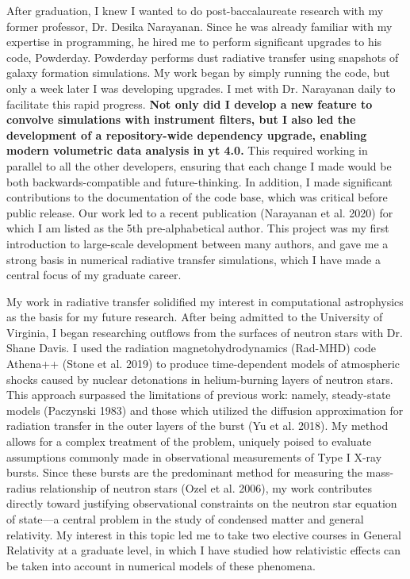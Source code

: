 \documentclass[11pt]{article}
\begin{document}
After graduation, I knew I wanted to do post-baccalaureate research with my former professor, Dr. Desika Narayanan. Since he was already familiar with my expertise in programming, he hired me to perform significant upgrades to his code, Powderday. Powderday performs dust radiative transfer using snapshots of galaxy formation simulations. My work began by simply running the code, but only a week later I was developing upgrades. I met with Dr. Narayanan daily to facilitate this rapid progress. \textbf{Not only did I develop a new feature to convolve simulations with instrument filters, but I also led the development of a repository-wide dependency upgrade, enabling modern volumetric data analysis in yt 4.0.} This required working in parallel to all the other developers, ensuring that each change I made would be both backwards-compatible and future-thinking. In addition, I made significant contributions to the documentation of the code base, which was critical before public release. Our work led to a recent publication (Narayanan et al. 2020) for which I am listed as the 5th pre-alphabetical author. This project was my first introduction to large-scale development between many authors, and gave me a strong basis in numerical radiative transfer simulations, which I have made a central focus of my graduate career.

My work in radiative transfer solidified my interest in computational astrophysics as the basis for my future research. After being admitted to the University of Virginia, I began researching outflows from the surfaces of neutron stars with Dr. Shane Davis. I used the radiation magnetohydrodynamics (Rad-MHD) code Athena++ (Stone et al. 2019) to produce time-dependent models of atmospheric shocks caused by nuclear detonations in helium-burning layers of neutron stars. This approach surpassed the limitations of previous work: namely, steady-state models (Paczynski 1983) and those which utilized the diffusion approximation for radiation transfer in the outer layers of the burst (Yu et al. 2018). My method allows for a complex treatment of the problem, uniquely poised to evaluate assumptions commonly made in observational measurements of Type I X-ray bursts. Since these bursts are the predominant method for measuring the mass-radius relationship of neutron stars (Ozel et al. 2006), my work contributes directly toward justifying observational constraints on the neutron star equation of state---a central problem in the study of condensed matter and general relativity. My interest in this topic led me to take two elective courses in General Relativity at a graduate level, in which I have studied how relativistic effects can be taken into account in numerical models of these phenomena.
\end{document}
